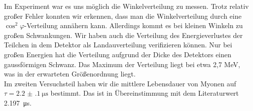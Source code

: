Im Experiment war es uns möglich die Winkelverteilung zu messen. Trotz relativ großer Fehler konnten wir erkennen, dass man die Winkelverteilung durch eine $\cos^2{\varphi}$-Verteilung annähern kann. Allerdings kommt es bei kleinen Winkeln zu großen Schwankungen. Wir haben auch die Verteilung des Energieverlustes der Teilchen in dem Detektor als Landauverteilung verifizieren können. Nur bei großen Energien hat die Verteilung aufgrund der Dicke des Detektors einen gaussförmigen Schwanz. Das Maximum der Verteilung liegt bei etwa 2,7 \si{\mega\eV}, was in der erwarteten Größenordnung liegt.\\
Im zweiten Versuchsteil haben wir die mittlere Lebensdauer von Myonen auf $\tau = \SI[separate-uncertainty = true]{2.2(1)}{\micro\second}$ bestimmt. Das ist in Übereinstimmung mit dem Literaturwert \SI{2.197}{\micro\second}\cite{pdg}.

